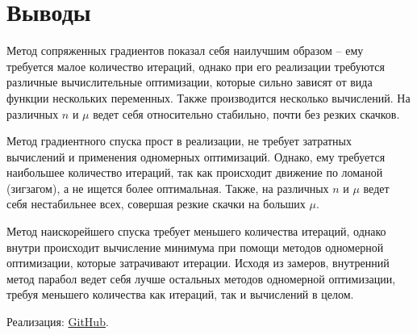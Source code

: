 \documentclass[12pt]{article}
\begin{document}
\section{Выводы}

Метод сопряженных градиентов показал себя наилучшим образом -- ему требуется малое количество итераций, однако при его реализации требуются различные вычислительные оптимизации, которые сильно зависят от вида функции нескольких переменных. Также производится несколько вычислений. На различных $n$ и $\mu$ ведет себя относительно стабильно, почти без резких скачков.

Метод градиентного спуска прост в реализации, не требует затратных вычислений и применения одномерных оптимизаций. Однако, ему требуется наибольшее количество итераций, так как происходит движение по ломаной (зигзагом), а не ищется более оптимальная. Также, на различных $n$ и $\mu$ ведет себя нестабильнее всех, совершая резкие скачки на больших $\mu$.

Метод наискорейшего спуска требует меньшего количества итераций, однако внутри происходит вычисление минимума при помощи методов одномерной оптимизации, которые затрачивают итерации. Исходя из замеров, внутренний метод парабол ведет себя лучше остальных методов одномерной оптимизации, требуя меньшего количества как итераций, так и вычислений в целом. 

Реализация: \href{https://github.com/Mr3zee/ITMO-Optimization-Methods-LAB2-2021/}{GitHub}.
\end{document}
